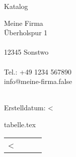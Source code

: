 \documentclass[a4paper,foldmarks=true]{scrartcl}
\makeatletter
\newcommand{\barcode}[1]{{\xlix@#1@}}
\newcommand\WG[1]{%
    \\ \pagebreak
    & \multicolumn{2}{c}{\underline{\textbf{#1}}} & \\ 
}
\newcommand\Zeile[5]{%
     \multirow{2}{25mm}{ \begin{picture}(25,40)(0,-12) \texttt{[image: \#1]} \end{picture} }& 
           \multicolumn{2}{p{115mm}}{\small #4} & \small #5 \\
     \nopagebreak & \small #2 & \multicolumn{1}{r}{\small #3 €}   &
            \ifthenelse{\equal{#5}{}}{}{\barcode{#5}}\\
     \\ 
}
\makeatother
\begin{document}
\clearpage
\thispagestyle{empty}
\fontsize{12}{15pt plus 0.15pt minus 0.1pt}\selectfont

\centering
\LARGE Katalog \\
\vspace{3cm}
\parbox{14cm}{
Meine Firma \\
Überholspur 1\\
\\
12345 Sonstwo\\
\\
Tel.: +49 1234 567890\\
info@meine-firma.false\\
}
\\
\vspace{1cm}
Erstelldatum: <%

\pagebreak
\thispagestyle{empty}
\tableofcontents

\begin{filecontents}{tabelle.tex}

\begin{longtable}{@{}p{25mm}p{52mm}p{53mm}p{45mm}@{}} %

    \endfirsthead

    \endhead

  \endfoot

  \endlastfoot

	<%
            \ifthenelse{\equal{<%
                  \WG{<%
                  \addcontentsline{toc}{section}{<%
		}
            { \Zeile{<%
	<%

	\hline
\end{longtable}
\end{filecontents}
\end{document}

